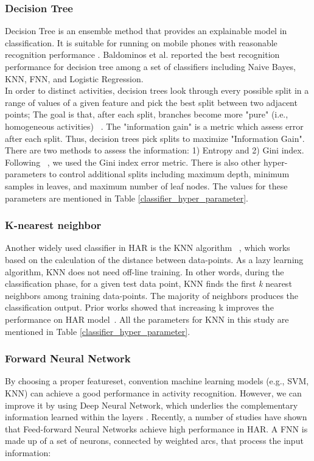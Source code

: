 \documentclass[journal,article,submit,moreauthors,pdftex]{Definitions/mdpi}
\begin{document}
\subsubsection{Decision Tree}

Decision Tree is an ensemble method that provides an explainable model in classification. It is suitable for running on mobile phones with reasonable recognition performance \cite{mortazavi2014determining, baldominos2019comparison, shoaib2016complex}. Baldominos et al. \cite{baldominos2019comparison} reported the best recognition performance for decision tree among a set of classifiers including Naive Bayes, KNN, FNN, and Logistic Regression.\\
In order to distinct activities, decision trees look through every possible split in a range of values of a given feature and pick the best split between two adjacent points; The goal is that, after each split, branches become more "pure" (i.e., homogeneous activities) ~\cite{bishop2006pattern}. The "information gain" is a metric which assess error after each split. Thus, decision trees pick splits to maximize "Information Gain". There are two methods to assess the information: 1) Entropy and 2) Gini index.\\
Following ~\cite{rosati2018comparison, masum2018human}, we used the Gini index error metric.
There is also other hyper-parameters to control additional splits including maximum depth, minimum samples in leaves, and maximum number of leaf nodes. The values for these parameters are mentioned in Table \ref{classifier_hyper_parameter}. 

\subsubsection{K-nearest neighbor}
Another widely used classifier in HAR is the KNN algorithm ~\cite{wang2019survey,shakya2018comparative}, which works based on the calculation of the distance between data-points. As a lazy learning algorithm, KNN does not need off-line training. In other words, during the classification phase, for a given test data point, KNN finds the first \textit{k} nearest neighbors among training data-points. The majority of neighbors produces the classification output. Prior works showed that increasing k improves the performance on HAR model~\cite{kose2012online}. All the parameters for KNN in this study are mentioned in Table \ref{classifier_hyper_parameter}.

\subsubsection{Forward Neural Network}
By choosing a proper featureset, convention machine learning models (e.g., SVM, KNN) can achieve a good performance in activity recognition. However, we can improve it by using Deep Neural Network, which underlies the complementary information learned within the layers \cite{chen2018distilling}.
Recently, a number of studies have shown that Feed-forward Neural Networks achieve high performance in HAR\cite{chen2018distilling, zhu2009human}. A FNN is made up of a set of neurons, connected by weighted arcs, that process the input information:
\end{document}
